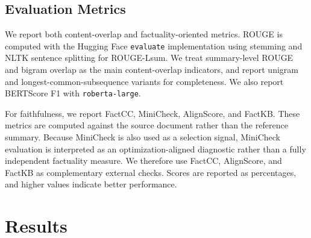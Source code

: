 \documentclass[11pt]{article}
\begin{document}
\subsection{Evaluation Metrics}
We report both content-overlap and factuality-oriented metrics. ROUGE is computed with the Hugging Face \texttt{evaluate} implementation using stemming and NLTK sentence splitting for ROUGE-Lsum. We treat summary-level ROUGE and bigram overlap as the main content-overlap indicators, and report unigram and longest-common-subsequence variants for completeness. We also report BERTScore F1 with \texttt{roberta-large}.

For faithfulness, we report FactCC, MiniCheck, AlignScore, and FactKB. These metrics are computed against the source document rather than the reference summary. Because MiniCheck is also used as a selection signal, MiniCheck evaluation is interpreted as an optimization-aligned diagnostic rather than a fully independent factuality measure. We therefore use FactCC, AlignScore, and FactKB as complementary external checks. Scores are reported as percentages, and higher values indicate better performance.
\section{Results}
\end{document}
